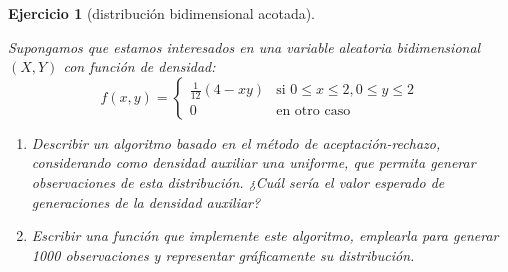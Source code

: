 \documentclass[
  10pt,
]{book}
\theoremstyle{break}
\newtheorem{exercise}{Ejercicio}[chapter]
\theoremstyle{nonumberplain}
\begin{document}
\begin{exercise}[distribución bidimensional acotada]
\protect\hypertarget{exr:ar-bidim-r}{}\label{exr:ar-bidim-r}

Supongamos que estamos interesados en una variable aleatoria bidimensional
\(\left( X,Y\right)\) con función de densidad:
\[f(x,y)=\left\{ 
\begin{array}{cl}
\frac{1}{12}(4-xy) & \text{si } 0 \le x \le 2 ,  0 \le y \le 2\\ 
0 & \text{en otro caso}
\end{array}
\right.\]

\begin{enumerate}
\def\labelenumi{\alph{enumi})}
\item
  Describir un algoritmo basado en el método de aceptación-rechazo,
  considerando como densidad auxiliar una uniforme, que permita
  generar observaciones de esta distribución.
  ¿Cuál sería el valor esperado de generaciones de la densidad auxiliar?
\item
  Escribir una función que implemente este algoritmo, emplearla para generar
  1000 observaciones y representar gráficamente su distribución.
\end{enumerate}

\end{exercise}
\end{document}
